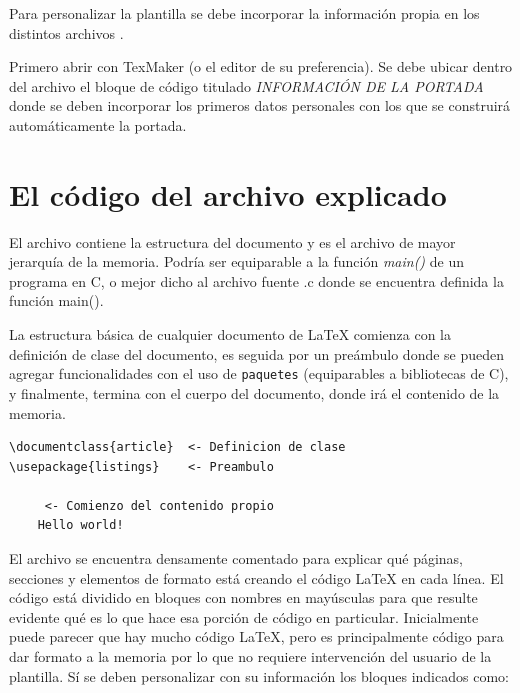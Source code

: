 Para personalizar la plantilla se debe incorporar la información propia en los distintos archivos . 

Primero abrir  con TexMaker (o el editor de su preferencia). Se debe ubicar dentro del archivo el bloque de código titulado \emph{INFORMACIÓN DE LA PORTADA} donde se deben incorporar los primeros datos personales con los que se construirá automáticamente la portada.



\section{El código del archivo  explicado}

El archivo  contiene la estructura del documento y es el archivo de mayor jerarquía de la memoria.  Podría ser equiparable a la función \emph{main()} de un programa en C, o mejor dicho al archivo fuente .c donde se encuentra definida la función main().

La estructura básica de cualquier documento de \LaTeX{} comienza con la definición de clase del documento, es seguida por un preámbulo donde se pueden agregar funcionalidades con el uso de \texttt{paquetes} (equiparables a bibliotecas de C), y finalmente, termina con el cuerpo del documento, donde irá el contenido de la memoria.


\begin{lstlisting}
\documentclass{article}  <- Definicion de clase
\usepackage{listings}	 <- Preambulo

	 <- Comienzo del contenido propio 
	Hello world!

\end{lstlisting}


El archivo  se encuentra densamente comentado para explicar qué páginas, secciones y elementos de formato está creando el código \LaTeX{} en cada línea. El código está dividido en bloques con nombres en mayúsculas para que resulte evidente qué es lo que hace esa porción de código en particular. Inicialmente puede parecer que hay mucho código \LaTeX{}, pero es principalmente código para dar formato a la memoria por lo que no requiere intervención del usuario de la plantilla.  Sí se deben personalizar con su información los bloques indicados como:

